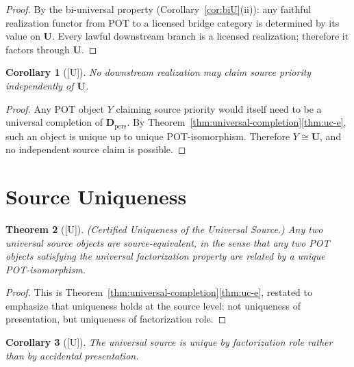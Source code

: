 \documentclass[12pt,oneside]{amsbook}
\theoremstyle{plain}
\newtheorem{theorem}{Theorem}[section]
\newtheorem{corollary}[theorem]{Corollary}
\theoremstyle{definition}
\theoremstyle{remark}
\newcommand{\status}[1]{\textup{[#1]}}
\begin{document}
\begin{proof}
By the bi-universal property (Corollary~\ref{cor:biU}\textup{(ii)}):
any faithful realization functor from $\mathrm{POT}$ to a licensed
bridge category is determined by its value on $\mathbf{U}$.  Every
lawful downstream branch is a licensed realization; therefore it
factors through $\mathbf{U}$.
\end{proof}

\begin{corollary}[\status{U}]\label{cor:no-competing-source}
No downstream realization may claim source priority independently of
$\mathbf{U}$.
\end{corollary}

\begin{proof}
Any POT object $Y$ claiming source priority would itself need to be a
universal completion of $\mathbf{D}_{\mathrm{pers}}$.  By
Theorem~\ref{thm:universal-completion}\ref{thm:uc-e}, such an object
is unique up to unique POT-isomorphism.  Therefore $Y \cong \mathbf{U}$,
and no independent source claim is possible.
\end{proof}

\section{Source Uniqueness}

\begin{theorem}[\status{U}]\label{thm:source-uniqueness}
\textup{(Certified Uniqueness of the Universal Source.)}  Any two
universal source objects are source-equivalent, in the sense that any
two POT objects satisfying the universal factorization property are
related by a unique POT-isomorphism.
\end{theorem}

\begin{proof}
This is Theorem~\ref{thm:universal-completion}\ref{thm:uc-e},
restated to emphasize that uniqueness holds at the source level: not
uniqueness of presentation, but uniqueness of factorization role.
\end{proof}

\begin{corollary}[\status{U}]\label{cor:unique-role}
The universal source is unique by factorization role rather than by
accidental presentation.
\end{corollary}
\end{document}
